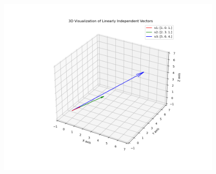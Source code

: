 \documentclass[journal]{IEEEtran}
\theoremstyle{remark}
\begin{document}
\begin{figure}[h]
    \centering
    \includegraphics[height=0.5\textheight, keepaspectratio]{figs/figure1.png}
    \label{figure_1}
\end{figure}
\end{document}
